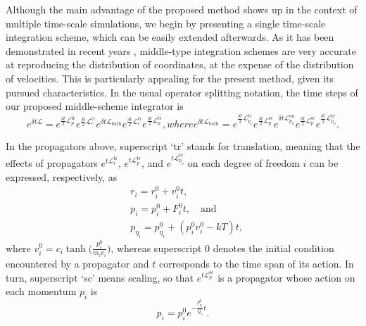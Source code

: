 \documentclass[
aip,
jcp,
reprint,
]{revtex4-1}
\newcommand{\Liu}{\mathcal{L}}
\begin{document}
Although the main advantage of the proposed method shows up in the context of multiple time-scale simulations, we begin by presenting a single time-scale integration scheme, which can be easily extended afterwards.
As it has been demonstrated in recent years \cite{Leimkuhler_2013b, Zhang_2017, Li_2017, Fass_2018, Zhang_2019}, middle-type integration schemes are very accurate at reproducing the distribution of coordinates, at the expense of the distribution of velocities.
This is particularly appealing for the present method, given its pursued characteristics.
In the usual operator splitting notation, the time steps of our proposed middle-scheme integrator is \cite{Zhang_2017}
\begin{subequations}
\label{eq:single time scale integrator}
\begin{equation}
\label{eq:middle-type integrator}
e^{\delta t\Liu} = e^{\frac{\delta t}{2} \Liu^\mathrm{tr}_p} e^{\frac{\delta t}{2} \Liu^\mathrm{tr}_r} e^{\delta t\Liu_\mathrm{bath}} e^{\frac{\delta t}{2} \Liu^\mathrm{tr}_r} e^{\frac{\delta t}{2} \Liu^\mathrm{tr}_p},
\end{equation}
where
\begin{equation}
\label{eq:bath propagator}
e^{\delta t\Liu_\mathrm{bath}} = e^{\frac{\delta t}{2} \Liu^\mathrm{tr}_{p_\eta}} e^{\frac{\delta t}{2} \Liu^\mathrm{sc}_p} e^{\delta t \Liu^\mathrm{ou}_{p_\eta}} e^{\frac{\delta t}{2} \Liu^\mathrm{sc}_p} e^{\frac{\delta t}{2} \Liu^\mathrm{tr}_{p_\eta}}.
\end{equation}
\end{subequations}

In the propagators above, superscript `tr' stands for translation, meaning that the effects of propagators $e^{t \Liu^\mathrm{tr}_r}$, $e^{t \Liu^\mathrm{tr}_p}$, and $e^{t \Liu^\mathrm{tr}_{p_\eta}}$ on each degree of freedom $i$ can be expressed, respectively, as
\begin{align}
&r_i = r_i^0 + v_i^0 t, \label{eq:NHL move} \\
&p_i = p_i^0 + F_i^0 t, \quad \mathrm{and}  \\
&p_{\eta_i} = p_{\eta_i}^0 + (p_i^0 v_i^0 - kT) t,
\end{align}
where $v_i^0 = c_i \tanh\big(\frac{p_i^0}{m_i c_i}\big)$, whereas superscript $0$ denotes the initial condition encountered by a propagator and $t$ corresponds to the time span of its action.
In turn, superscript `sc' means scaling, so that $e^{t \Liu^\mathrm{sc}_p}$ is a propagator whose action on each momentum $p_i$ is
\begin{equation}
p_i = p_i^0 e^{-\frac{p_{\eta_i}^0}{Q_i} t}.
\end{equation}
\end{document}
